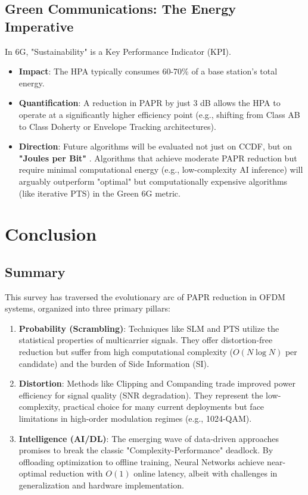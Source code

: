 \documentclass[12pt, a4paper, onecolumn]{article}
\begin{document}
\subsection{Green Communications: The Energy Imperative}
In 6G, "Sustainability" is a Key Performance Indicator (KPI).

\begin{itemize}
    \item \textbf{Impact}: The HPA typically consumes 60-70\% of a base station's total energy.
    \item \textbf{Quantification}: A reduction in PAPR by just 3 dB allows the HPA to operate at a significantly higher efficiency point (e.g., shifting from Class AB to Class Doherty or Envelope Tracking architectures).
    \item \textbf{Direction}: Future algorithms will be evaluated not just on CCDF, but on \textbf{"Joules per Bit"} \cite{ref14}. Algorithms that achieve moderate PAPR reduction but require minimal computational energy (e.g., low-complexity AI inference) will arguably outperform "optimal" but computationally expensive algorithms (like iterative PTS) in the Green 6G metric.
\end{itemize}

\section{Conclusion}

\subsection{Summary}
This survey has traversed the evolutionary arc of PAPR reduction in OFDM systems, organized into three primary pillars:

\begin{enumerate}
    \item \textbf{Probability (Scrambling)}: Techniques like SLM and PTS utilize the statistical properties of multicarrier signals. They offer distortion-free reduction but suffer from high computational complexity ($O(N \log N)$ per candidate) and the burden of Side Information (SI).
    \item \textbf{Distortion}: Methods like Clipping and Companding trade improved power efficiency for signal quality (SNR degradation). They represent the low-complexity, practical choice for many current deployments but face limitations in high-order modulation regimes (e.g., 1024-QAM).
    \item \textbf{Intelligence (AI/DL)}: The emerging wave of data-driven approaches promises to break the classic "Complexity-Performance" deadlock. By offloading optimization to offline training, Neural Networks achieve near-optimal reduction with $O(1)$ online latency, albeit with challenges in generalization and hardware implementation.
\end{enumerate}
\end{document}
